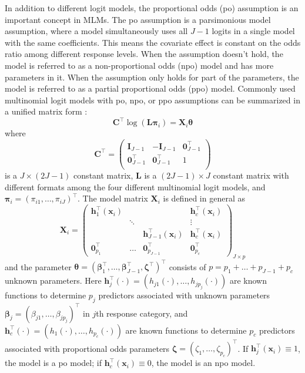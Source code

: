 In addition to different logit models, the proportional odds (po) assumption is an important concept in MLMs. The po assumption is a parsimonious model assumption, where a model simultaneously uses all $J-1$ logits in a single model with the same coefficients. This means the covariate effect is constant on the odds ratio among different response levels. When the assumption doesn't hold, the model is referred to as a non-proportional odds (npo) model and has more parameters in it. When the assumption only holds for part of the parameters, the model is referred to as a partial proportional odds (ppo) model.
Commonly used multinomial logit models with po, npo, or ppo assumptions can be summarized in a unified matrix form \citep{pmcc1995, atkinson1999, bu2020}:
$$\mathbf C^\top \log(\mathbf L \boldsymbol \pi_i) = \mathbf X_i \boldsymbol \theta$$
where $$\mathbf C^\top = \begin{pmatrix}
\mathbf I_{J-1} & -\mathbf I_{J-1} & \mathbf 0^\top_{J-1} \\
\mathbf 0^\top_{J-1} & \mathbf 0^\top_{J-1} & 1 \\
\end{pmatrix}$$
is a $J \times (2J-1)$ constant matrix, $\mathbf L$ is a $(2J-1)\times J$ constant matrix with different formats among the four different multinomial logit models, and $\boldsymbol \pi_i = (\pi_{i1},\dots,\pi_{iJ})^\top$. The model matrix $\mathbf X_i$ is defined in general as
$$\mathbf X_i = \begin{pmatrix}
    \mathbf h_1^\top(\mathbf x_i)&  &  & \mathbf h_c^\top(\mathbf x_i)\\
     & \ddots & & \vdots\\
      & & \mathbf h_{J-1}^\top (\mathbf x_i) & \mathbf h_{c}^\top (\mathbf x_i)\\
      \mathbf 0^\top_{p_1} & \dots & \mathbf 0^\top_{p_{J-1}} & \mathbf 0^\top_{p_c}
\end{pmatrix}_{J \times p}
$$
and the parameter $\boldsymbol \theta=(\boldsymbol\beta_1^\top, \dots, \boldsymbol \beta^\top_{J-1}, \boldsymbol\zeta^\top)^\top$ consists of $p=p_1 + \dots + p_{J-1}+p_c$ unknown parameters. Here $\mathbf h_j^\top(\cdot) = (h_{j1}(\cdot),\dots, h_{jp_j}(\cdot))$ are known functions to determine $p_j$ predictors associated with unknown parameters $\boldsymbol \beta_j = (\beta_{j1}, \dots, \beta_{jp_{j}})^\top$ in $j$th response category, and $\mathbf h_c^\top(\cdot) = (h_{1}(\cdot),\dots, h_{p_c}(\cdot))$ are known functions to determine $p_c$ predictors associated with proportional odds parameters $\boldsymbol \zeta = (\zeta_1, \dots, \zeta_{p_c})^\top$. If $\mathbf h_j^\top(\mathbf x_i)\equiv1$, the model is a po model; if $\mathbf h_c^\top(\mathbf x_i)\equiv0$, the model is an npo model.

